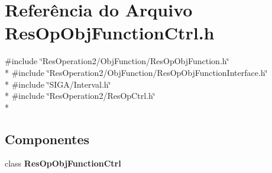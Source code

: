 \section{Referência do Arquivo Res\+Op\+Obj\+Function\+Ctrl.\+h}
\label{_res_op_obj_function_ctrl_8h}
{\ttfamily \#include \char`\"{}Res\+Operation2/\+Obj\+Function/\+Res\+Op\+Obj\+Function.\+h\char`\"{}}\\*
{\ttfamily \#include \char`\"{}Res\+Operation2/\+Obj\+Function/\+Res\+Op\+Obj\+Function\+Interface.\+h\char`\"{}}\\*
{\ttfamily \#include \char`\"{}S\+I\+G\+A/\+Interval.\+h\char`\"{}}\\*
{\ttfamily \#include \char`\"{}Res\+Operation2/\+Res\+Op\+Ctrl.\+h\char`\"{}}\\*
\subsection*{Componentes}
\begin{DoxyCompactItemize}
\item 
class {\bf Res\+Op\+Obj\+Function\+Ctrl}
\end{DoxyCompactItemize}
